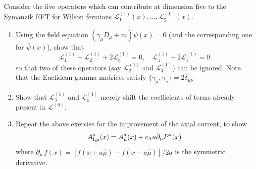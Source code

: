 Consider the five operators which can contribute at dimension five to the Symanzik EFT for Wilson fermions $\mathcal{L}_1^{(1)}(x), \dots, \mathcal{L}_5^{(1)}(x)$.

\begin{enumerate}
	\item Using the field equation $(\gamma_{\mu}D_{\mu} + m)\psi(x) = 0$ (and the corresponding one for $\bar{\psi}(x)$), show that
	      \begin{equation}
		      \mathcal{L}_1^{(1)} - \mathcal{L}_2^{(1)} + 2\mathcal{L}_5^{(1)} = 0, \quad \mathcal{L}_4^{(1)} + 2\mathcal{L}_5^{(1)} = 0
	      \end{equation}
	      so that two of these operators (say $\mathcal{L}_2^{(1)}$ and $\mathcal{L}_4^{(1)}$) can be ignored. Note that the Euclidean gamma matrices satisfy $\{\gamma_{\mu},\gamma_{\nu}\} = 2\delta_{\mu\nu}$
	\item Show that $\mathcal{L}_{3}^{(1)}$ and $\mathcal{L}_5^{(1)}$ merely shift the coefficients of terms already present in $\mathcal{L}^{(0)}$.
	\item Repeat the above exercise for the improvement of the axial current, to show
	      \begin{equation}
		      A^{a}_{{\rm I},\mu}(x) = A^{a}_{\mu}(x) + c_{\rm A} a \hat{\partial}_{\mu}P^{a}(x)
	      \end{equation}
	      where $\hat{\partial}_\mu \, f(x) = [f(x+a\hat{\mu}) - f(x - a\hat{\mu})]/2a$ is the symmetric derivative.
\end{enumerate}